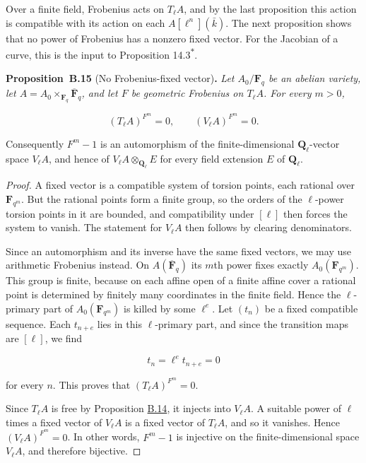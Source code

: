 \documentclass[11pt]{article}
\newenvironment{bpstatement}[2]{\par\addvspace{0.6\baselineskip}\noindent\textbf{#1}#2\textbf{.}\enspace\ignorespaces}
  {\par\addvspace{0.4\baselineskip}}
\newenvironment{bpstatementit}[2]{\begin{bpstatement}{#1}{#2}\itshape\ignorespaces}{\end{bpstatement}}
\newcommand{\bpout}[1]{#1\textsuperscript{\hyperlink{bp-outside}{\ensuremath{\ast}}}}
\begin{document}
\label{bp116}%
Over a finite field, Frobenius acts on \(T_\ell A\), and by the last proposition this action is compatible with its action on each \(A[\ell^n](\bar k)\). The next proposition shows that no power of Frobenius has a nonzero fixed vector. For the Jacobian of a curve, this is the input to Proposition \bpout{14.3}.

\label{bp117}%
\begin{bpstatementit}{Proposition~B.15}{ (No Frobenius-fixed vector)}
Let \(A_0/\mathbf F_q\) be an abelian variety, let \(A=A_0\times_{\mathbf F_q}\overline{\mathbf F}_q\), and let \(F\) be geometric Frobenius on \(T_\ell A\). For every \(m>0\),

\[
(T_\ell A)^{F^m}=0,
\qquad (V_\ell A)^{F^m}=0.
\]

Consequently \(F^m-1\) is an automorphism of the finite-dimensional \(\mathbf Q_\ell\)-vector space \(V_\ell A\), and hence of \(V_\ell A\otimes_{\mathbf Q_\ell}E\) for every field extension \(E\) of \(\mathbf Q_\ell\).
\end{bpstatementit}

\begin{proof}[{Proof}]\label{bp118}%
A fixed vector is a compatible system of torsion points, each rational over \(\mathbf F_{q^m}\). But the rational points form a finite group, so the orders of the \(\ell\)-power torsion points in it are bounded, and compatibility under \([\ell]\) then forces the system to vanish. The statement for \(V_\ell A\) then follows by clearing denominators.

Since an automorphism and its inverse have the same fixed vectors, we may use arithmetic Frobenius instead. On \(A(\overline{\mathbf F}_q)\) its \(m\)th power fixes exactly \(A_0(\mathbf F_{q^m})\). This group is finite, because on each affine open of a finite affine cover a rational point is determined by finitely many coordinates in the finite field. Hence the \(\ell\)-primary part of \(A_0(\mathbf F_{q^m})\) is killed by some \(\ell^e\). Let \((t_n)\) be a fixed compatible sequence. Each \(t_{n+e}\) lies in this \(\ell\)-primary part, and since the transition maps are \([\ell]\), we find

\[
t_n=\ell^e t_{n+e}=0
\]

for every \(n\). This proves that \((T_\ell A)^{F^m}=0\).

Since \(T_\ell A\) is free by Proposition \hyperref[bp114]{B.14}, it injects into \(V_\ell A\). A suitable power of \(\ell\) times a fixed vector of \(V_\ell A\) is a fixed vector of \(T_\ell A\), and so it vanishes. Hence \((V_\ell A)^{F^m}=0\). In other words, \(F^m-1\) is injective on the finite-dimensional space \(V_\ell A\), and therefore bijective.
\end{proof}
\end{document}
